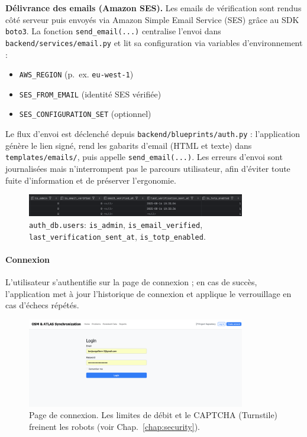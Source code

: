 \begin{itemize}
\noindent\textbf{Délivrance des emails (Amazon SES).} Les emails de vérification sont rendus côté serveur puis envoyés via Amazon Simple Email Service (SES) grâce au SDK \texttt{boto3}. La fonction \texttt{send\_email(...)} centralise l'envoi dans \texttt{backend/services/email.py} et lit sa configuration via variables d'environnement :
\begin{itemize}
  \item \texttt{AWS\_REGION} (p.~ex. \texttt{eu-west-1})
  \item \texttt{SES\_FROM\_EMAIL} (identité SES vérifiée)
  \item \texttt{SES\_CONFIGURATION\_SET} (optionnel)
\end{itemize}
Le flux d'envoi est déclenché depuis \texttt{backend/blueprints/auth.py} : l'application génère le lien signé, rend les gabarits d'email (HTML et texte) dans \texttt{templates/emails/}, puis appelle \texttt{send\_email(...)}. Les erreurs d'envoi sont journalisées mais n'interrompent pas le parcours utilisateur, afin d'éviter toute fuite d'information et de préserver l'ergonomie.

\begin{figure}[H]
  \centering
  \includegraphics[width=0.85\textwidth]{../figures/chap10/auth_db2.png}
  \caption{\texttt{auth\_db.users}: \texttt{is\_admin}, \texttt{is\_email\_verified}, \texttt{last\_verification\_sent\_at}, \texttt{is\_totp\_enabled}.}
\end{figure}

\paragraph{Connexion}
L'utilisateur s'authentifie sur la page de connexion ; en cas de succès, l'application met à jour l'historique de connexion et applique le verrouillage en cas d'échecs répétés.

\begin{figure}[H]
  \centering
  \includegraphics[width=0.85\textwidth]{../figures/chap10/login_page.png}
  \caption{Page de connexion. Les limites de débit et le CAPTCHA (Turnstile) freinent les robots (voir Chap.~\ref{chap:security}).}
\end{figure}


\end{itemize}
